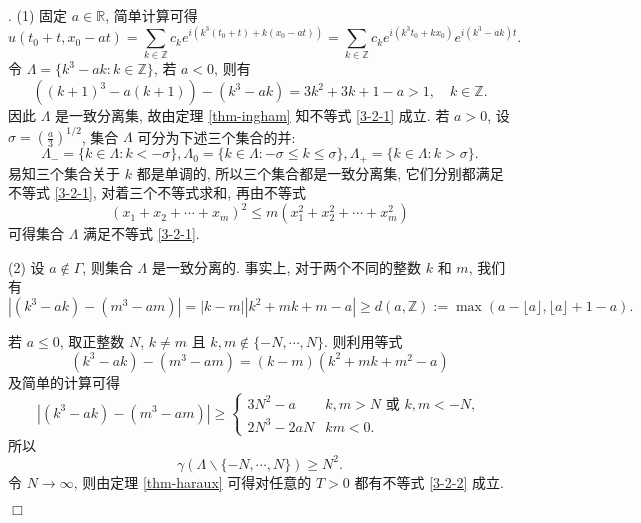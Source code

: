 \documentclass[master]{cugthesis}
\newcommand\R{\ensuremath{\mathbb{R}}}
\newcommand\Z{\ensuremath{\mathbb{Z}}}
\newenvironment{proof}{{\noindent\itshape 证明}.}{\hfill $\Box$\par}
\begin{document}
    \begin{proof}
     (1) 固定 $a\in\R$, 简单计算可得
     \begin{equation}\label{3-2-4}
         u(t_0+t,x_0-at)=\sum_{k\in \Z} c_k e^{i(k^3(t_0+t)+k(x_0-at))}=\sum_{k\in \Z}c_k  e^{i (k^3t_0+kx_0)} e^{i(k^3-ak)t}.
     \end{equation}
    令 $\Lambda=\lbrace k^3-ak: k\in \Z\rbrace$, 若 $a<0$, 则有
    \begin{equation*}
        ((k+1)^3-a(k+1))-(k^3-ak)=3k^2+3k+1-a>1,\quad k\in \Z.
    \end{equation*}
    因此 $\Lambda$ 是一致分离集, 故由定理 \ref{thm-ingham} 知不等式 \eqref{3-2-1} 成立. 若 $a>0$, 设 $\sigma=\left(\frac{a}{3}\right)^{1 /2}$, 集合 $\Lambda$ 可分为下述三个集合的并:
    \begin{equation*}
        \Lambda_-=\lbrace k\in \Lambda : k<-\sigma\rbrace, \Lambda_0=\lbrace k\in \Lambda : -\sigma\le k\le \sigma\rbrace,\Lambda_+=\lbrace k\in\Lambda: k>\sigma\rbrace.
    \end{equation*}
    易知三个集合关于 $k$ 都是单调的, 所以三个集合都是一致分离集, 它们分别都满足不等式 \eqref{3-2-1}, 对着三个不等式求和, 再由不等式
    \begin{equation*}
        (x_1+x_2+\cdots+x_m)^2\le m (x_1^2+x_2^2+\cdots+x_m^2)
    \end{equation*}
    可得集合 $\Lambda$ 满足不等式 \eqref{3-2-1}.
    
    (2) 设 $a\notin \Gamma$, 则集合 $\Lambda$ 是一致分离的. 事实上, 对于两个不同的整数 $k$ 和 $m$, 我们有
    \begin{equation*}
        |(k^3-ak)-(m^3-am)|=|k-m||k^2+mk+m-a|\ge d(a,\Z):=\max(a-\lfloor a\rfloor,\lfloor a\rfloor +1-a). 
    \end{equation*}
    
    若 $a\le 0$, 取正整数 $N$, $k\neq m$ 且 $k,m\notin\lbrace-N,\cdots, N\rbrace$. 则利用等式
    \begin{equation*}
        (k^3-ak)-(m^3-am)=(k-m)(k^2+mk+m^2-a)
    \end{equation*}
    及简单的计算可得
    \begin{equation}\label{3-22-3}
        \left| (k^3-ak)-(m^3-am) \right|\ge \left\lbrace\begin{array}{ll}
            3N^2-a & k,m> N \text{ 或 } k,m <-N, \\
             2N^3-2aN  & km<0.
        \end{array}\right.
    \end{equation}
    所以
    \begin{equation*}
        \gamma\left(\Lambda \backslash \lbrace-N,\cdots,N\rbrace\right)\ge N^2.
    \end{equation*}
    令 $N\to \infty$, 则由定理 \ref{thm-haraux} 可得对任意的 $T>0$ 都有不等式 \eqref{3-2-2} 成立.
    

\end{proof}
\end{document}
